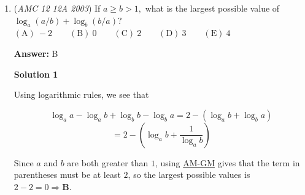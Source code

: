 \begin{enumerate}
 $\textbf{(A)}\ 504\qquad\textbf{(B)}\ 672\qquad\textbf{(C)}\ 864\qquad\textbf{(D)}\ 936\qquad\textbf{(E)}\ 1008$

 \textbf{Answer: }B



\textbf{Solution 1}

We want to find the number of perfect square factors in the product of all the factorials of numbers from $1 - 9$. We can write this out and take out the factorials, and then find a prime factorization of the entire product. We can also find this prime factorization by finding the number of times each factor is repeated in each factorial. This comes out to be equal to $2^{30} \cdot 3^{13} \cdot 5^5 \cdot 7^3$. To find the amount of perfect square factors, we realize that each exponent in the prime factorization must be even: $2^{15} \cdot 3^{6}\cdot 5^2 \cdot 7^1$. To find the total number of possibilities, we add $1$ to each exponent and multiply them all together. This gives us $16 \cdot 7 \cdot 3 \cdot 2 = 672$ $\Rightarrow\boxed{\mathrm{(B)}}$.

 



\textbf{Solution 2}

(Explanation of 1)

 Factorials up to 9 in product lead to prime factorization $2^{30}$ $*$ $3^{13}$ $*$ $5^5$ $*$ $7^3$ So the number of pairs possible is { $2^{0}$ $,$ $2^{2}$ $,$ ... $2^{30}$ }{ $3^{0}$ $,$ $3^{2}$ $,$ ... $3^{12}$ }{ $5^{0}$ $,$ $5^{2}$ $,$ ... $5^{4}$ }{ $7^{0}$ $,$ $7^{2}$ }

 Which leads to resulting number of pairs = $16*7*3*2$ $=$ $672$ $\Rightarrow\boxed{\mathrm{(B)}}$.

 


	\item (\textit{AMC 12 12A 2003}) If $a\geq b > 1,$ what is the largest possible value of $\log_{a}(a/b) + \log_{b}(b/a)?$
$\mathrm{(A)}\ -2      \qquad \mathrm{(B)}\ 0     \qquad \mathrm{(C)}\ 2      \qquad \mathrm{(D)}\ 3      \qquad \mathrm{(E)}\ 4$

 \textbf{Answer: }B



\textbf{Solution 1}

Using logarithmic rules, we see that

 
 \[\log_{a}a-\log_{a}b+\log_{b}b-\log_{b}a = 2-(\log_{a}b+\log_{b}a)\]
 \[=2-\left(\log_{a}b+\frac {1}{\log_{a}b}\right)\]

 Since $a$ and $b$ are both greater than $1$, using \href{https://artofproblemsolving.com/wiki/index.php?title=AM-GM}{AM-GM} gives that the term in parentheses must be at least $2$, so the largest possible values is $2-2=0 \Rightarrow \boxed{\textbf{B}}.$


\end{enumerate}
